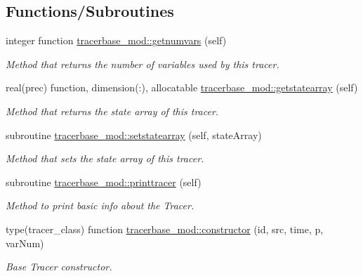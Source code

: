 \subsection*{Functions/\+Subroutines}
\begin{DoxyCompactItemize}
\item 
integer function \mbox{\hyperlink{namespacetracerbase__mod_a0be55b393be0846cbbe6be9feb3bb539}{tracerbase\+\_\+mod\+::getnumvars}} (self)
\begin{DoxyCompactList}\small\item\em Method that returns the number of variables used by this tracer. \end{DoxyCompactList}\item 
real(prec) function, dimension(\+:), allocatable \mbox{\hyperlink{namespacetracerbase__mod_adbdd85bd57f1a9debbe7b682099afb1d}{tracerbase\+\_\+mod\+::getstatearray}} (self)
\begin{DoxyCompactList}\small\item\em Method that returns the state array of this tracer. \end{DoxyCompactList}\item 
subroutine \mbox{\hyperlink{namespacetracerbase__mod_af85802e927b07e777b94375550246c16}{tracerbase\+\_\+mod\+::setstatearray}} (self, state\+Array)
\begin{DoxyCompactList}\small\item\em Method that sets the state array of this tracer. \end{DoxyCompactList}\item 
subroutine \mbox{\hyperlink{namespacetracerbase__mod_ae320123e374df674769dbd48ba5ef46f}{tracerbase\+\_\+mod\+::printtracer}} (self)
\begin{DoxyCompactList}\small\item\em Method to print basic info about the Tracer. \end{DoxyCompactList}\item 
type(tracer\+\_\+class) function \mbox{\hyperlink{namespacetracerbase__mod_acf861b7ca360dcad1331ca85c50853a6}{tracerbase\+\_\+mod\+::constructor}} (id, src, time, p, var\+Num)
\begin{DoxyCompactList}\small\item\em Base Tracer constructor. \end{DoxyCompactList}\end{DoxyCompactItemize}
